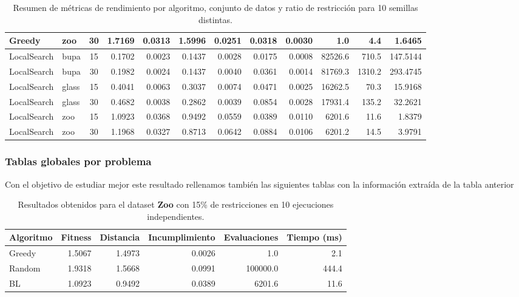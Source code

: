 \documentclass[12pt]{article}
\begin{document}
\begin{table}[H]
{\begin{tabular}{llcrrrrrrrrr}
            Greedy & zoo & 30 & 1.7169 & 0.0313 & 1.5996 & 0.0251 & 0.0318 & 0.0030 & 1.0 & 4.4 & 1.6465 \\
            \midrule
            LocalSearch & bupa & 15 & 0.1702 & 0.0023 & 0.1437 & 0.0028 & 0.0175 & 0.0008 & 82526.6 & 710.5 & 147.5144 \\
            LocalSearch & bupa & 30 & 0.1982 & 0.0024 & 0.1437 & 0.0040 & 0.0361 & 0.0014 & 81769.3 & 1310.2 & 293.4745 \\
            LocalSearch & glass & 15 & 0.4041 & 0.0063 & 0.3037 & 0.0074 & 0.0471 & 0.0025 & 16262.5 & 70.3 & 15.9168 \\
            LocalSearch & glass & 30 & 0.4682 & 0.0038 & 0.2862 & 0.0039 & 0.0854 & 0.0028 & 17931.4 & 135.2 & 32.2621 \\
            LocalSearch & zoo & 15 & 1.0923 & 0.0368 & 0.9492 & 0.0559 & 0.0389 & 0.0110 & 6201.6 & 11.6 & 1.8379 \\
            LocalSearch & zoo & 30 & 1.1968 & 0.0327 & 0.8713 & 0.0642 & 0.0884 & 0.0106 & 6201.2 & 14.5 & 3.9791 \\
            \bottomrule
        \end{tabular}%
        }
        \caption{Resumen de métricas de rendimiento por algoritmo, conjunto de datos y ratio de restricción para 10 semillas distintas.}
    \end{table}

    \subsubsection{Tablas globales por problema}

    Con el objetivo de estudiar mejor este resultado rellenamos también las siguientes tablas con la información extraída de la tabla anterior

    \begin{table}[H]
        \centering
        \begin{tabular}{lrrrrr}
            \hline
            Algoritmo & Fitness & Distancia & Incumplimiento & Evaluaciones & Tiempo (ms)\\
            \hline
            Greedy & 1.5067 & 1.4973 & 0.0026 & 1.0 & 2.1 \\
            Random & 1.9318 & 1.5668 & 0.0991 & 100000.0 & 444.4 \\
            BL & 1.0923 & 0.9492 & 0.0389 & 6201.6 & 11.6 \\
            \hline
        \end{tabular}
        \caption{Resultados obtenidos para el dataset \textbf{Zoo} con 15\% de restricciones en 10 ejecuciones independientes.} %
    \end{table} 
\end{document}
